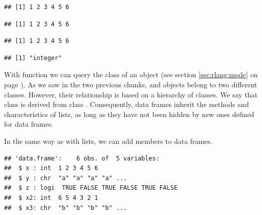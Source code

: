 \documentclass[krantz2]{krantz}\usepackage{knitr}
\begin{document}
\begin{knitrout}\footnotesize
{}\color{fgcolor}\begin{kframe}
\begin{alltt}
\hlopt{$}
\end{alltt}
\begin{verbatim}
## [1] 1 2 3 4 5 6
\end{verbatim}
\begin{alltt}
\hlstd{a.df[[}\hlstd{]]}
\end{alltt}
\begin{verbatim}
## [1] 1 2 3 4 5 6
\end{verbatim}
\begin{alltt}
\hlstd{a.df[[}\hlstd{]]}
\end{alltt}
\begin{verbatim}
## [1] 1 2 3 4 5 6
\end{verbatim}
\begin{alltt}
\hlstd{(a.df[[}\hlstd{]])}
\end{alltt}
\begin{verbatim}
## [1] "integer"
\end{verbatim}
\end{kframe}
\end{knitrout}

With function  we can query the class of an \Rlang object (see section \ref{sec:rlang:mode} on page \pageref{sec:rlang:mode}). As we saw in the two previous chunks,  and  objects belong to two different classes. However, their relationship is based on a hierarchy of classes. We say that class  is derived from class . Consequently, data frames inherit the methods and characteristics of lists, as long as they have not been hidden by new ones defined for data frames.

In the same way as with lists, we can add members to data frames.

\begin{knitrout}\footnotesize
{}\color{fgcolor}\begin{kframe}
\begin{alltt}
\hlopt{$} \hlkwb{<-} \hlopt{:}
\hlopt{$} \hlkwb{<-} 
\end{alltt}
\begin{verbatim}
## 'data.frame':	6 obs. of  5 variables:
##  $ x : int  1 2 3 4 5 6
##  $ y : chr  "a" "a" "a" "a" ...
##  $ z : logi  TRUE FALSE TRUE FALSE TRUE FALSE
##  $ x2: int  6 5 4 3 2 1
##  $ x3: chr  "b" "b" "b" "b" ...
\end{verbatim}
\end{kframe}
\end{knitrout}
\end{document}
